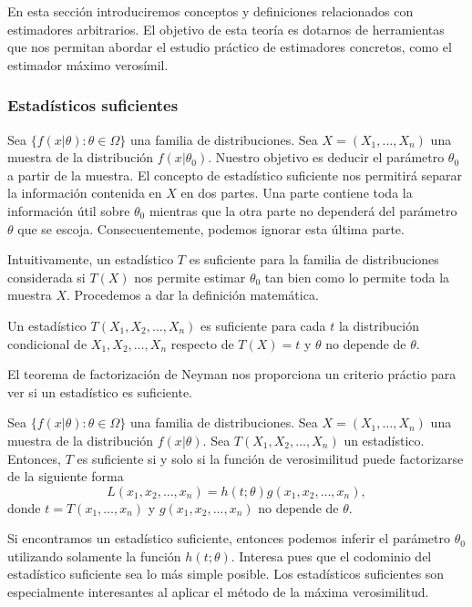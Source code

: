 \documentclass{article}
\begin{document}
    En esta sección introduciremos conceptos y definiciones relacionados con estimadores arbitrarios. El objetivo de esta teoría es dotarnos de herramientas que nos permitan abordar el estudio práctico de estimadores concretos, como el estimador máximo verosímil.

    \subsubsection{Estadísticos suficientes}

        Sea $\{f(x|\theta): \theta \in \Omega\}$ una familia de distribuciones. Sea $X = (X_1 , \ldots, X_n)$ una muestra de la distribución $f(x|\theta_0)$. Nuestro objetivo es deducir el parámetro $\theta_0$ a partir de la muestra. El concepto de estadístico suficiente nos permitirá separar la información contenida en $X$ en dos partes. Una parte contiene toda la información útil sobre $\theta_0$ mientras que la otra parte no dependerá del parámetro $\theta$ que se escoja. Consecuentemente, podemos ignorar esta última parte.

        Intuitivamente, un estadístico $T$ es suficiente para la familia de distribuciones considerada si $T(X)$ nos permite estimar $\theta_0$ tan bien como lo permite toda la muestra $X$. Procedemos a dar la definición matemática.

        \begin{definition}
            Un estadístico $T(X_1, X_2, \ldots, X_n)$ es suficiente para cada $t$ la distribución condicional de $X_1, X_2, \ldots, X_n$ respecto de $T(X) = t$ y $\theta$ no depende de $\theta$.
        \end{definition}

        El teorema de factorización de Neyman nos proporciona un criterio práctio para ver si un estadístico es suficiente.

        \begin{thm}
            Sea $\{f(x|\theta): \theta \in \Omega\}$ una familia de distribuciones. Sea $X = (X_1 , \ldots, X_n)$ una muestra de la distribución $f(x|\theta)$. Sea $T(X_1, X_2, \ldots, X_n)$ un estadístico. Entonces, $T$ es  suficiente si y solo si la función de verosimilitud puede factorizarse de la siguiente forma
            \[L(x_1, x_2, \ldots, x_n) = h(t;\theta) g(x_1, x_2, \ldots, x_n),\]
            donde $t = T(x_1, \ldots, x_n)$ y $g(x_1, x_2, \ldots, x_n)$ no depende de $\theta$.
        \end{thm}

        Si encontramos un estadístico suficiente, entonces podemos inferir el parámetro $\theta_0$ utilizando solamente la función $h(t;\theta)$. Interesa pues que el codominio del estadístico suficiente sea lo más simple posible. Los estadísticos suficientes son especialmente interesantes al aplicar el método de la máxima verosimilitud.
\end{document}
